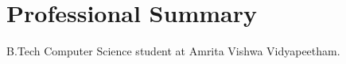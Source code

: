 \section{\textbf{Professional Summary}}

B.Tech Computer Science student at Amrita Vishwa Vidyapeetham.
